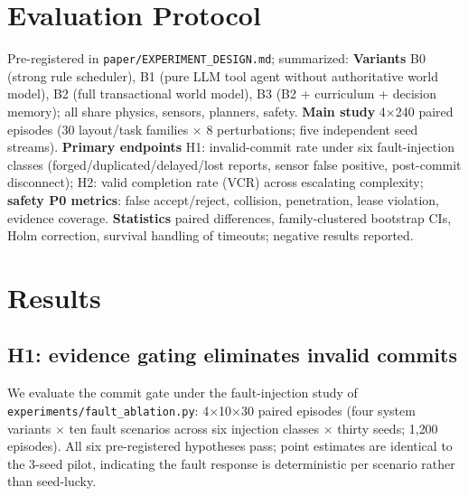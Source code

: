 \documentclass[11pt]{article}
\begin{document}
\section{Evaluation Protocol}\label{sec:protocol}
Pre-registered in \texttt{paper/EXPERIMENT\_DESIGN.md}; summarized:
\textbf{Variants} B0 (strong rule scheduler), B1 (pure LLM tool agent without
authoritative world model), B2 (full transactional world model), B3 (B2 +
curriculum + decision memory); all share physics, sensors, planners, safety.
\textbf{Main study} 4$\times$240 paired episodes (30 layout/task families
$\times$ 8 perturbations; five independent seed streams).
\textbf{Primary endpoints} H1: invalid-commit rate under six fault-injection
classes (forged/duplicated/delayed/lost reports, sensor false positive,
post-commit disconnect); H2: valid completion rate (VCR) across escalating
complexity; \textbf{safety P0 metrics}: false accept/reject, collision,
penetration, lease violation, evidence coverage.
\textbf{Statistics} paired differences, family-clustered bootstrap CIs, Holm
correction, survival handling of timeouts; negative results reported.

\section{Results}\label{sec:results}

\subsection{H1: evidence gating eliminates invalid commits}\label{sec:h1}
We evaluate the commit gate under the fault-injection study of
\texttt{experiments/fault\_ablation.py}: 4$\times$10$\times$30 paired
episodes (four system variants $\times$ ten fault scenarios across six
injection classes $\times$ thirty seeds; 1{,}200 episodes). All six
pre-registered hypotheses pass; point estimates are identical to the
3-seed pilot, indicating the fault response is deterministic per scenario
rather than seed-lucky.
\end{document}
